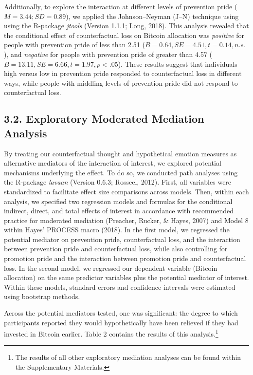 \documentclass[man,floatsintext]{apa6}
\let\rmarkdownfootnote\footnote%
\def\footnote{\protect\rmarkdownfootnote}
\begin{document}
Additionally, to explore the interaction at different levels of prevention pride (\(M = 3.44; SD = 0.89\)), we applied the Johnson--Neyman (J--N) technique using using the R-package \emph{jtools} (Version 1.1.1; Long, 2018). This analysis revealed that the conditional effect of counterfactual loss on Bitcoin allocation was \emph{positive} for people with prevention pride of less than 2.51 (\(B = 0.64, SE = 4.51, t = 0.14, n.s.\)), and \emph{negative} for people with prevention pride of greater than 4.57 (\(B = 13.11, SE = 6.66, t = 1.97, p < .05\)). These results suggest that individuals high versus low in prevention pride responded to counterfactual loss in different ways, while people with middling levels of prevention pride did not respond to counterfactual loss.

\hypertarget{exploratory-moderated-mediation-analysis}{%
\subsection{3.2. Exploratory Moderated Mediation Analysis}\label{exploratory-moderated-mediation-analysis}}

By treating our counterfactual thought and hypothetical emotion measures as alternative mediators of the interaction of interest, we explored potential mechanisms underlying the effect. To do so, we conducted path analyses using the R-package \emph{lavaan} (Version 0.6.3; Rosseel, 2012). First, all variables were standardized to facilitate effect size comparisons across models. Then, within each analysis, we specified two regression models and formulas for the conditional indirect, direct, and total effects of interest in accordance with recommended practice for moderated mediation (Preacher, Rucker, \& Hayes, 2007) and Model 8 within Hayes' PROCESS macro (2018). In the first model, we regressed the potential mediator on prevention pride, counterfactual loss, and the interaction between prevention pride and counterfactual loss, while also controlling for promotion pride and the interaction between promotion pride and counterfactual loss. In the second model, we regressed our dependent variable (Bitcoin allocation) on the same predictor variables plus the potential mediator of interest. Within these models, standard errors and confidence intervals were estimated using bootstrap methods.

Across the potential mediators tested, one was significant: the degree to which participants reported they would hypothetically have been relieved if they had invested in Bitcoin earlier. Table 2 contains the results of this analysis.\footnote{The results of all other exploratory mediation analyses can be found within the Supplementary Materials.}
\end{document}

